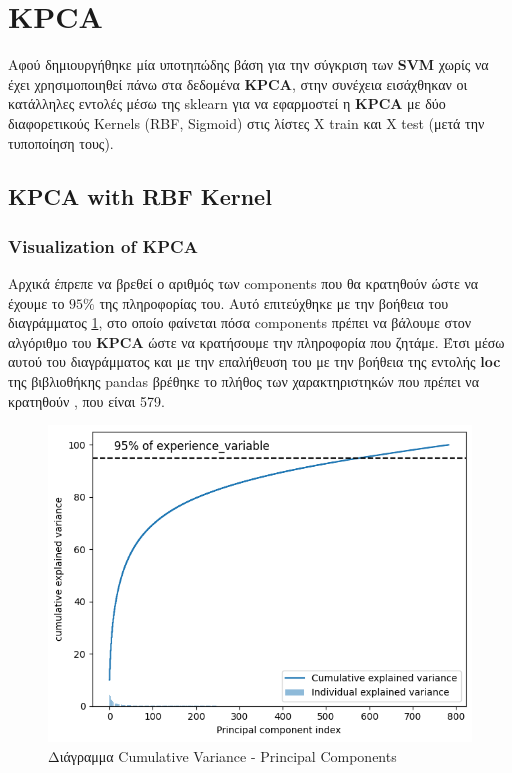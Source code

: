 \section{KPCA}

Αφού δημιουργήθηκε μία υποτηπώδης βάση για την σύγκριση των \textbf{SVM} χωρίς να έχει χρησιμοποιηθεί πάνω στα δεδομένα \textbf{KPCA}, στην συνέχεια εισάχθηκαν οι κατάλληλες εντολές μέσω της sklearn για να εφαρμοστεί η \textbf{KPCA} με δύο διαφορετικούς Κernels (RBF, Sigmoid) στις λίστες Χ train και Χ test (μετά την τυποποίηση τους).


\subsection{KPCA with RBF Kernel}

\subsubsection{Visualization of KPCA}
Αρχικά έπρεπε να βρεθεί ο αριθμός των components που θα κρατηθούν ώστε να έχουμε το $95\%$ της πληροφορίας του. Αυτό επιτεύχθηκε με την βοήθεια του διαγράμματος \ref{f:g1}, στο οποίο φαίνεται πόσα components πρέπει να βάλουμε στον αλγόριθμο του \textbf{KPCA} ώστε να κρατήσουμε την πληροφορία που ζητάμε. Έτσι μέσω αυτού του διαγράμματος και με την επαλήθευση του με την βοήθεια της εντολής \textbf{loc} της βιβλιοθήκης pandas βρέθηκε το πλήθος των χαρακτηριστηκών που πρέπει να κρατηθούν , που είναι 579.


\begin{figure}[ht]
	\centering
	\includegraphics[width=1\linewidth]{Images data1/KPCARBFplot.png}
	\caption{ Διάγραμμα Cumulative Variance - Principal Components   }
	\label{f:g1}	
\end{figure}
\clearpage
